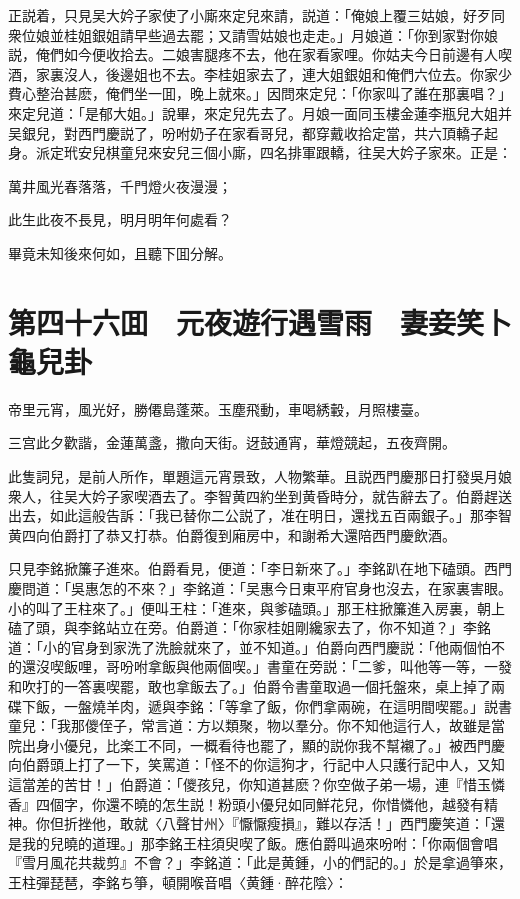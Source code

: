 正説着，只見吴大妗子家使了小廝來定兒來請，説道：「俺娘上覆三姑娘，好歹同衆位娘並桂姐銀姐請早些過去罷；又請雪姑娘也走走。」月娘道：「你到家對你娘説，俺們如今便收拾去。二娘害腿疼不去，他在家看家哩。你姑夫今日前邊有人喫酒，家裏沒人，後邊姐也不去。李桂姐家去了，連大姐銀姐和俺們六位去。你家少費心整治甚麽，俺們坐一囬，晚上就來。」因問來定兒：「你家叫了誰在那裏唱？」來定兒道：「是郁大姐。」說畢，來定兒先去了。月娘一面同玉樓金蓮李瓶兒大姐并吴銀兒，對西門慶説了，吩咐奶子在家看哥兒，都穿戴收拾定當，共六頂轎子起身。派定玳安兒棋童兒來安兒三個小廝，四名排軍跟轎，往吴大妗子家來。正是：

萬井風光春落落，千門燈火夜漫漫；

此生此夜不長見，明月明年何處看？

畢竟未知後來何如，且聽下囬分解。

\chapter*{第四十六囬　元夜遊行遇雪雨　妻妾笑卜龜兒卦}

帝里元宵，風光好，勝僊島蓬萊。玉塵飛動，車喝綉轂，月照樓臺。

三宫此夕歡諧，金蓮萬盞，撒向天街。迓鼓通宵，華燈競起，五夜齊開。

此隻詞兒，是前人所作，單題這元宵景致，人物繁華。且説西門慶那日打發吳月娘衆人，往吴大妗子家喫酒去了。李智黄四約坐到黄昏時分，就告辭去了。伯爵趕送出去，如此這般告訴：「我已替你二公説了，准在明日，還找五百兩銀子。」那李智黄四向伯爵打了恭又打恭。伯爵復到廂房中，和謝希大還陪西門慶飲酒。

只見李銘掀簾子進來。伯爵看見，便道：「李日新來了。」李銘趴在地下磕頭。西門慶問道：「吳惠怎的不來？」李銘道：「吴惠今日東平府官身也沒去，在家裏害眼。小的叫了王柱來了。」便叫王柱：「進來，與爹磕頭。」那王柱掀簾進入房裏，朝上磕了頭，與李銘站立在旁。伯爵道：「你家桂姐剛纔家去了，你不知道？」李銘道：「小的官身到家洗了洗臉就來了，並不知道。」伯爵向西門慶説：「他兩個怕不的還沒喫飯哩，哥吩咐拿飯與他兩個喫。」書童在旁説：「二爹，叫他等一等，一發和吹打的一答裏喫罷，敢也拿飯去了。」伯爵令書童取過一個托盤來，桌上掉了兩碟下飯，一盤燒羊肉，遞與李銘：「等拿了飯，你們拿兩碗，在這明間喫罷。」説書童兒：「我那儍侄子，常言道：方以類聚，物以羣分。你不知他這行人，故雖是當院出身小優兒，比楽工不同，一概看待也罷了，顯的説你我不幫襯了。」被西門慶向伯爵頭上打了一下，笑罵道：「怪不的你這狗才，行記中人只護行記中人，又知這當差的苦甘！」伯爵道：「儍孩兒，你知道甚麽？你空做子弟一場，連『惜玉憐香』四個字，你還不曉的怎生説！粉頭小優兒如同鮮花兒，你惜憐他，越發有精神。你但折挫他，敢就〈八聲甘州〉『懨懨瘦損』，難以存活！」西門慶笑道：「還是我的兒曉的道理。」那李銘王柱須臾喫了飯。應伯爵叫過來吩咐：「你兩個會唱『雪月風花共裁剪』不會？」李銘道：「此是黄鍾，小的們記的。」於是拿過箏來，王柱彈琵琶，李銘ち箏，頓開喉音唱〈黄鍾·醉花陰〉：

